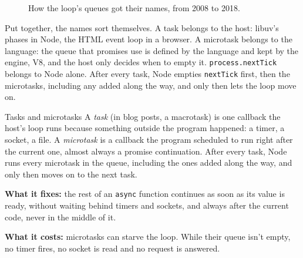 \begin{figure}[htbp]
\centering
{}
\caption{How the loop's queues got their names, from 2008 to 2018.}
\end{figure}

Put together, the names sort themselves. A task belongs to the host: libuv's
phases in Node, the HTML event loop in a browser. A microtask belongs to the
language: the queue that promises use is defined by the language and kept by
the engine, V8, and the host only decides when to empty it. \texttt{process.nextTick} belongs to Node alone.
After every task, Node empties \texttt{nextTick} first, then the microtasks,
including any added along the way, and only then lets the loop move on.

\begin{concept}{Tasks and microtasks}
A \emph{task} (in blog posts, a macrotask) is one callback the host's loop runs
because something outside the program happened: a timer, a socket, a file. A
\emph{microtask} is a callback the program scheduled to run right after the
current one, almost always a promise continuation. After every task, Node runs every
microtask in the queue, including the ones added along the way, and only then
moves on to the next task.

\textbf{What it fixes:} the rest of an \texttt{async} function continues as
soon as its value is ready, without waiting behind timers and sockets, and
always after the current code, never in the middle of it.

\textbf{What it costs:} microtasks can starve the loop. While their queue isn't
empty, no timer fires, no socket is read and no request is answered.
\end{concept}

